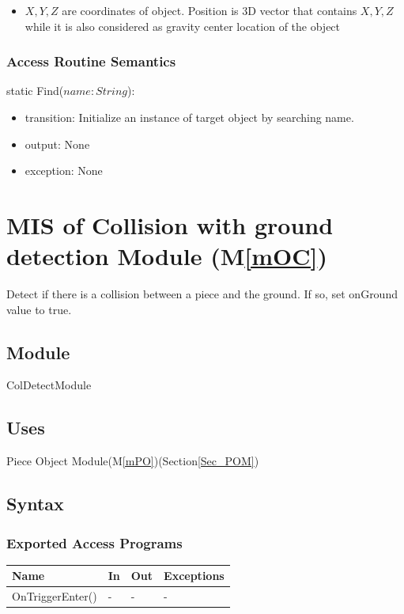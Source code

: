 \documentclass[12pt, titlepage]{article}
\newcommand{\mref}[1]{M\ref{#1}}
\begin{document}
\noindent
\begin{itemize}
	\item $X,Y,Z$ are coordinates of object. Position is 3D vector that contains $X,Y,Z$ while it is also considered as gravity center location of the object
\end{itemize}

\subsubsection{Access Routine Semantics}

\noindent static Find($name: String$):
\begin{itemize}
	\item transition: Initialize an instance of target object by searching name.
	\item output: None
	\item exception: None
\end{itemize}


\section{MIS of Collision with ground detection Module (\mref{mOC})}
\label{Sec_CDM}
Detect if there is a collision between a piece and the ground. If so, set onGround
value to true.

\subsection{Module}

ColDetectModule

\subsection{Uses}

Piece Object Module(\mref{mPO})(Section\ref{Sec_POM})

\subsection{Syntax}

\subsubsection{Exported Access Programs}

\begin{center}
	\begin{tabular}{p{4cm} p{4cm} p{4cm} p{2cm}}
		\hline
		\textbf{Name} & \textbf{In} & \textbf{Out} & \textbf{Exceptions} \\
		\hline
		OnTriggerEnter() & - & - & - \\
		\hline
	\end{tabular}
\end{center}
\end{document}
